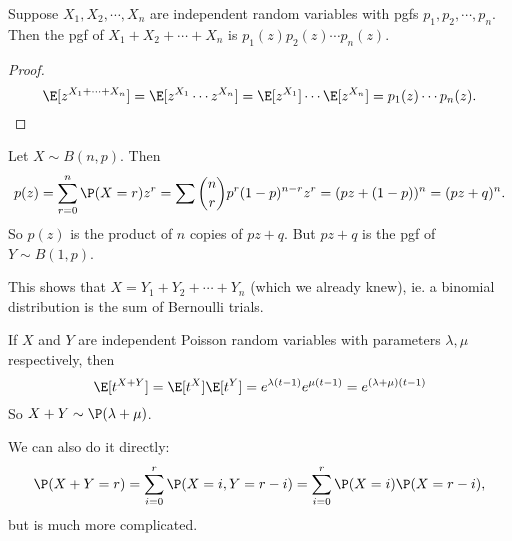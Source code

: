 \documentclass[a4paper]{article}
\begin{document}
\begin{thm}
  Suppose $X_1, X_2, \cdots, X_n$ are independent random variables with pgfs $p_1, p_2, \cdots, p_n$. Then the pgf of $X_1 + X_2 + \cdots + X_n$ is $p_1(z)p_2(z)\cdots p_n(z)$.
\end{thm}

\begin{proof}
  \[
    \E[z^{X_1 + \cdots + X_n}] = \E[z^{X_1}\cdots z^{X_n}] = \E[z^{X_1}]\cdots\E[z^{X_n}] = p_1(z)\cdots p_n(z).
  \]
\end{proof}

\begin{eg}
  Let $X\sim B(n, p)$. Then
  \[
    p(z) = \sum_{r = 0}^{n} \P(X = r)z^r = \sum \binom{n}{r} p^r(1 - p)^{n - r}z^r = (pz + (1 - p))^n = (pz + q)^n.
  \]
  So $p(z)$ is the product of $n$ copies of $pz + q$. But $pz + q$ is the pgf of $Y\sim B(1, p)$.

  This shows that $X = Y_1 + Y_2 + \cdots + Y_n$ (which we already knew), ie. a binomial distribution is the sum of Bernoulli trials.
\end{eg}

\begin{eg}
  If $X$ and $Y$ are independent Poisson random variables with parameters $\lambda, \mu$ respectively, then
  \[
    \E[t^{X + Y}] = \E[t^X]\E[t^Y] = e^{\lambda(t - 1)}e^{\mu(t - 1)} = e^{(\lambda + \mu)(t - 1)}
  \]
  So $X + Y\sim \P(\lambda + \mu)$.

  We can also do it directly:
  \[
    \P(X + Y = r) = \sum_{i = 0}^r \P(X = i, Y = r - i) = \sum_{i = 0}^r \P(X = i)\P(X = r - i),
  \]
  but is much more complicated.
\end{eg}
\end{document}

